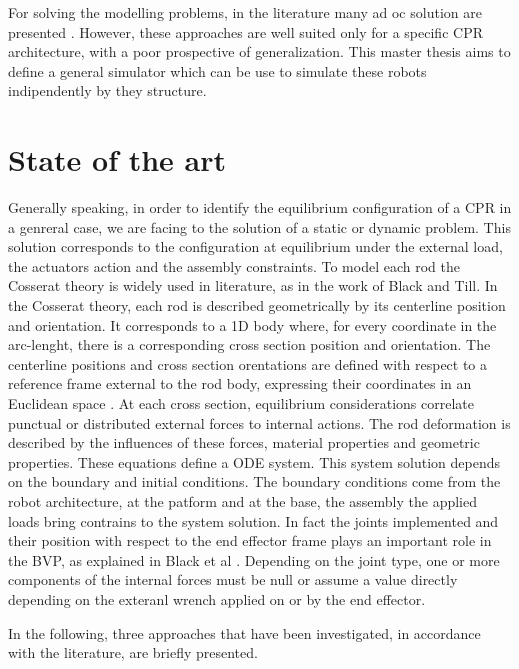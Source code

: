 \documentclass{thesisreport}
\begin{document}
 For solving the modelling problems, in the literature many ad oc solution are presented \cite{till_efficient_2015}\cite{black_parallel_2018}\cite{till_real-time_2019}. However, these approaches are well suited only for a specific CPR architecture, with a poor prospective of generalization. This master thesis aims to define a general simulator which can be use to simulate these robots indipendently by they structure. 
 
 \chapter{State of the art}
 Generally speaking, in order to identify the equilibrium configuration of a CPR in a genreral case, we are facing to the solution of a static or dynamic problem. This solution corresponds to the configuration at equilibrium under the external load, the actuators action and the assembly constraints. To model each rod the Cosserat theory is widely used in literature, as in the work of Black\cite{black_parallel_2018}\cite{black_modeling_2017} and Till\cite{till_efficient_2015}\cite{till_real-time_2019}. In the Cosserat theory, each rod is described geometrically by its centerline position and orientation. It corresponds to a 1D body where, for every coordinate in the arc-lenght, there is a corresponding cross section position and orientation. The centerline positions and cross section orentations are defined with respect to a reference frame external to the rod body, expressing their coordinates in an Euclidean space \cite{selig_geometric_2005}. 
 At each cross section, equilibrium considerations correlate punctual or distributed external forces to internal actions. The rod deformation is described by the influences of these forces, material properties and geometric properties. These equations define a ODE system. This system solution depends on the boundary and initial conditions. The boundary conditions come from the robot architecture, at the patform and at the base, the assembly the applied loads bring contrains to the system solution. In fact the joints implemented and their position with respect to the end effector frame plays an important role in the BVP, as explained in Black et al \cite{black_parallel_2018}. Depending on the joint type, one or more components of the internal forces must be null or assume a value directly depending on the exteranl wrench applied on or by the end effector.  
 
 In the following, three approaches that have been investigated, in accordance with the literature, are briefly presented.
 
\end{document}
